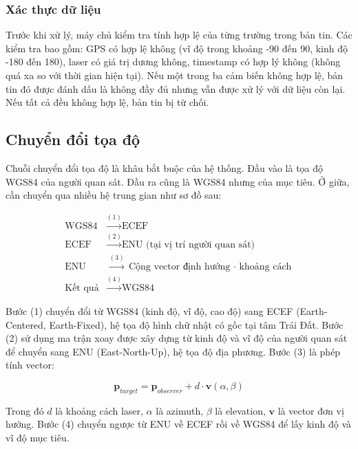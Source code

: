 \subsubsection{Xác thực dữ liệu}

\hspace{0.5cm} Trước khi xử lý, máy chủ kiểm tra tính hợp lệ của từng trường trong bản tin. Các kiểm tra bao gồm: GPS có hợp lệ không (vĩ độ trong khoảng -90 đến 90, kinh độ -180 đến 180), laser có giá trị dương không, timestamp có hợp lý không (không quá xa so với thời gian hiện tại). Nếu một trong ba cảm biến không hợp lệ, bản tin đó được đánh dấu là không đầy đủ nhưng vẫn được xử lý với dữ liệu còn lại. Nếu tất cả đều không hợp lệ, bản tin bị từ chối.

\subsection{Chuyển đổi tọa độ}

\hspace{0.5cm} Chuỗi chuyển đổi tọa độ là khâu bắt buộc của hệ thống. Đầu vào là tọa độ WGS84 của người quan sát. Đầu ra cũng là WGS84 nhưng của mục tiêu. Ở giữa, cần chuyển qua nhiều hệ trung gian như sơ đồ sau:

\begin{equation}
\begin{aligned}
\text{WGS84} &\xrightarrow{(1)} \text{ECEF} \\
\text{ECEF} &\xrightarrow{(2)} \text{ENU (tại vị trí người quan sát)} \\
\text{ENU} &\xrightarrow{(3)} \text{Cộng vector định hướng $\cdot$ khoảng cách} \\
\text{Kết quả} &\xrightarrow{(4)} \text{WGS84}
\end{aligned}
\end{equation}

Bước (1) chuyển đổi từ WGS84 (kinh độ, vĩ độ, cao độ) sang ECEF (Earth-Centered, Earth-Fixed), hệ tọa độ hình chữ nhật có gốc tại tâm Trái Đất. Bước (2) sử dụng ma trận xoay được xây dựng từ kinh độ và vĩ độ của người quan sát để chuyển sang ENU (East-North-Up), hệ tọa độ địa phương. Bước (3) là phép tính vector:

\begin{equation}
\mathbf{p}_{target} = \mathbf{p}_{observer} + d \cdot \mathbf{v}(\alpha, \beta)
\end{equation}

Trong đó $d$ là khoảng cách laser, $\alpha$ là azimuth, $\beta$ là elevation, $\mathbf{v}$ là vector đơn vị hướng. Bước (4) chuyển ngược từ ENU về ECEF rồi về WGS84 để lấy kinh độ và vĩ độ mục tiêu.

